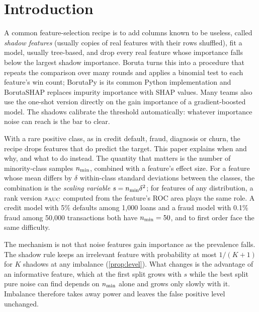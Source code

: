 \section{Introduction}\label{sec:intro}

A common feature-selection recipe is to add columns known to be useless, called \emph{shadow features} (usually copies of real features with their rows shuffled), fit a model, usually tree-based, and drop every real feature whose importance falls below the largest shadow importance. Boruta \citep{kursa2010boruta} turns this into a procedure that repeats the comparison over many rounds and applies a binomial test to each feature's win count; BorutaPy \citep{homola2015borutapy} is its common Python implementation and BorutaSHAP \citep{keany2020borutashap} replaces impurity importance with SHAP values. Many teams also use the one-shot version directly on the gain importance of a gradient-boosted model. The shadows calibrate the threshold automatically: whatever importance noise can reach is the bar to clear.

With a rare positive class, as in credit default, fraud, diagnosis or churn, the recipe drops features that do predict the target. This paper explains when and why, and what to do instead. The quantity that matters is the number of minority-class samples $n_{\min}$, combined with a feature's effect size. For a feature whose mean differs by $\delta$ within-class standard deviations between the classes, the combination is the \emph{scaling variable} $s = n_{\min}\delta^2$; for features of any distribution, a rank version $s_{\mathrm{AUC}}$ computed from the feature's ROC area plays the same role. A credit model with 5\% defaults among 1{,}000 loans and a fraud model with 0.1\% fraud among 50{,}000 transactions both have $n_{\min} = 50$, and to first order face the same difficulty.

The mechanism is not that noise features gain importance as the prevalence falls. The shadow rule keeps an irrelevant feature with probability at most $1/(K+1)$ for $K$ shadows at any imbalance (\cref{prop:level}). What changes is the advantage of an informative feature, which at the first split grows with $s$ while the best split pure noise can find depends on $n_{\min}$ alone and grows only slowly with it. Imbalance therefore takes away power and leaves the false positive level unchanged.

